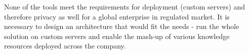 None of the tools meet the requirements for deployment (custom servers) and therefore privacy as well for a global enterprise in regulated market. It is necessary to design an architecture that would fit the needs - run the whole solution on custom servers and enable the mash-up of various knowledge resources deployed across the company.